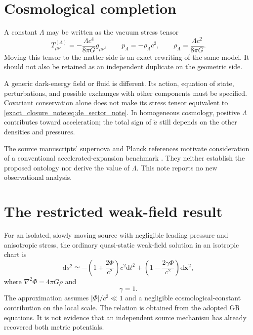 \documentclass[11pt,oneside]{report}
\newcommand{\Ph}{\Phi}
\newcommand{\dd}{\mathrm d}
\theoremstyle{remark}
\numberwithin{definition}{chapter}
\numberwithin{proposition}{chapter}
\numberwithin{remark}{chapter}
\begin{document}
\section{Cosmological completion}
A constant $\Lambda$ may be written as the vacuum stress tensor
\begin{equation}
T^{(\Lambda)}_{\mu\nu}=-\frac{\Lambda c^4}{8\pi G}g_{\mu\nu},
\qquad p_\Lambda=-\rho_\Lambda c^2,
\qquad \rho_\Lambda=\frac{\Lambda c^2}{8\pi G}.
\label{exact_closure_note:eq:de_sector_note}
\end{equation}
Moving this tensor to the matter side is an exact rewriting of the same model. It should not also be retained as an independent duplicate on the geometric side.

A generic dark-energy field or fluid is different. Its action, equation of state, perturbations, and possible exchanges with other components must be specified. Covariant conservation alone does not make its stress tensor equivalent to \eqref{exact_closure_note:eq:de_sector_note}. In homogeneous cosmology, positive $\Lambda$ contributes toward acceleration; the total sign of $\ddot a$ still depends on the other densities and pressures.

The source manuscripts' supernova and Planck references motivate consideration of a conventional accelerated-expansion benchmark \parencite{Riess1998,Perlmutter1999,Planck2018Parameters}. They neither establish the proposed ontology nor derive the value of $\Lambda$. This note reports no new observational analysis.

\section{The restricted weak-field result}
For an isolated, slowly moving source with negligible leading pressure and anisotropic stress, the ordinary quasi-static weak-field solution in an isotropic chart is
\begin{equation}
\dd s^2\simeq-\left(1+\frac{2\Ph}{c^2}\right)c^2\dd t^2+
\left(1-\frac{2\gamma\Ph}{c^2}\right)\dd\mathbf x^2,
\label{exact_closure_note:eq:weakfield}
\end{equation}
where $\nabla^2\Ph=4\pi G\rho$ and
\begin{equation}
\gamma=1.
\label{exact_closure_note:eq:gamma}
\end{equation}
The approximation assumes $|\Ph|/c^2\ll1$ and a negligible cosmological-constant contribution on the local scale. The relation is obtained from the adopted GR equations. It is not evidence that an independent source mechanism has already recovered both metric potentials.
\end{document}

